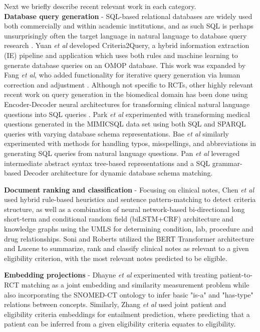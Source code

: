 \documentclass[../main.tex]{subfiles}
\begin{document}
\noindent Next we briefly describe recent relevant work in each category. \\

\textbf{Database query generation} - SQL-based relational databases are widely used both commercially and within academic institutions, and as such SQL is perhaps unsurprisingly often the target language in natural language to database query research \cite{dar2019frameworks}. Yuan \textit{et al} developed Criteria2Query, a hybrid information extraction (IE) pipeline and application which uses both rules and machine learning to generate database queries on an OMOP database. This work was expanded by Fang \textit{et al}, who added functionality for iterative query generation via human correction and adjustment \cite{fang2022combining}. Although not specific to RCTs, other highly relevant recent work on query generation in the biomedical domain has been done using Encoder-Decoder neural architectures for transforming clinical natural language questions into SQL queries \cite{bae2021question, park2021knowledge, wang2020text, pan2021bert, dhayne2021emr2vec}. Park \textit{et al} \cite{park2021knowledge} experimented with transforming medical questions generated in the MIMICSQL data set \cite{johnson2016mimic, wang2020text} using both SQL and SPARQL queries with varying database schema representations. Bae \textit{et al} similarly experimented with methods for handling typos, misspellings, and abbreviations in generating SQL queries from natural language questions. Pan \textit{et al} \cite{pan2021bert} leveraged intermediate abstract syntax tree-based representations and a SQL grammar-based Decoder architecture for dynamic database schema matching. 

\textbf{Document ranking and classification} - Focusing on clinical notes, Chen \textit{et al} \cite{chen2019clinical} used hybrid rule-based heuristics and sentence pattern-matching to detect criteria structure, as well as a combination of neural network-based bi-directional long short-term and conditional random field (biLSTM+CRF) architecture and knowledge graphs using the UMLS for determining condition, lab, procedure and drug relationships. Soni and Roberts \cite{soni2020patient} utilized the BERT Transformer architecture \cite{devlin2018bert} and Lucene \cite{lucene} to summarize, rank and classify clinical notes as relevant to a given eligibility criterion, with the most relevant notes predicted to be eligible. 

\textbf{Embedding projections} - Dhayne \textit{et al} \cite{dhayne2021emr2vec} experimented with treating patient-to-RCT matching as a joint embedding and similarity measurement problem while also incorporating the SNOMED-CT ontology to infer basic "is-a" and "has-type" relations between concepts. Similarly, Zhang \textit{et al} \cite{zhang2020deepenroll} used joint patient and eligibility criteria embeddings for entailment prediction, where predicting that a patient can be inferred from a given eligibility criteria equates to eligibility. 
\end{document}
